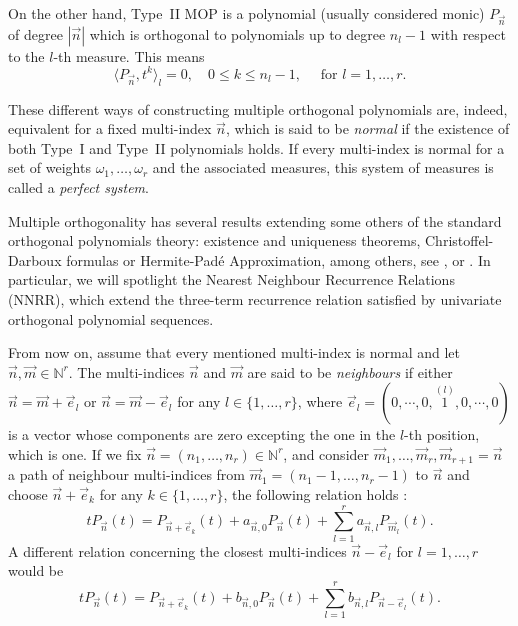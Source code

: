 \documentclass[a4paper]{article}
\theoremstyle{plain}
\theoremstyle{definition}
\newcommand{\NN}{\mathbb{N}}
\newcommand{\innerprod}[2]{\langle #1 , #2 \rangle}
\begin{document}
On the other hand, Type~II MOP is a polynomial (usually considered monic) $P_{\vec n}$ of degree $|\vec n|$ which is orthogonal to polynomials up to degree $n_l-1$ with respect to the $l$-th measure. This means
\begin{equation}
    \label{eq:type-ii-orthogonality-1-var}
    \innerprod{P_{\vec n}}{t^k}_l = 0, \quad 0\leq k\leq n_l-1, \quad \text{ for } l=1,\dots, r.
\end{equation}

These different ways of constructing multiple orthogonal polynomials are, indeed, equivalent for a fixed multi-index $\vec n$, which is said to be \emph{normal} if the existence of both Type~I and Type~II polynomials holds. If every multi-index is normal for a set of weights $\omega_1,\dots,\omega_r$ and the associated measures, this system of measures is called a \emph{perfect system}. 

Multiple orthogonality has several results extending some others of the standard orthogonal polynomials theory: existence and uniqueness theorems, Christoffel-Darboux formulas or Hermite-Padé Approximation, among others, see \citep[Section 23.1]{Ism05}, or \citep[Section 1]{VA20}. In particular, we will spotlight the Nearest Neighbour Recurrence Relations (NNRR), which extend the three-term recurrence relation satisfied by univariate orthogonal polynomial sequences.

From now on, assume that every mentioned multi-index is normal and let $\vec n,\vec m \in \NN^r$. The multi-indices $\vec n$ and $\vec m$ are said to be \emph{neighbours} if either $\vec n = \vec m + \vec e_l$ or $\vec n = \vec m - \vec e_l$ for any $l\in\{1,\dots,r\}$, where $\vec e_l = (0,\cdots,0, \overset{(l)}{1},0,\cdots,0)$ is a vector whose components are zero excepting the one in the $l$-th position, which is one. If we fix $\vec n=(n_1,\dots,n_r)\in\NN^r$, and consider $\vec m_{1},\dots,\vec m_r,\vec m_{r+1}=\vec n$ a path of neighbour multi-indices from $\vec m_1 =(n_1-1,\dots,n_r-1)$ to $\vec n$ and choose $\vec n+\vec e_k$ for any $k\in\{1,\dots,r\}$, the following relation holds \cite[Theorem 23.1.7]{Ism05}:
\begin{equation}
    \label{eq:NNRR-1-var}
    t P_{\vec n}(t) = P_{\vec n+\vec e_k}(t) + a_{\vec n,0} P_{\vec n}(t) + \sum_{l=1}^r a_{\vec n,l} P_{\vec m_l}(t).
\end{equation}
A different relation concerning the closest multi-indices $\vec n-\vec e_l$ for $l=1,\dots,r$ would be \cite[Section 3.2]{VA20}
\begin{equation}
    \label{eq:NNRR-1-var-2}
    t P_{\vec n}(t) = P_{\vec n+\vec e_k}(t) + b_{\vec n,0} P_{\vec n}(t) + \sum_{l=1}^r b_{\vec n,l} P_{\vec n-\vec e_l}(t).
\end{equation}
\end{document}
